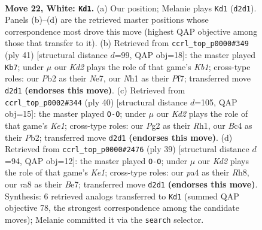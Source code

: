 \documentclass[11pt]{article}
\begin{document}
\clearpage

\begin{figure}[p]\centering
\begin{subfigure}{0.46\textwidth}\centering
\resizebox{\linewidth}{!}{%
\newchessgame
\chessboard[
  setfen={r3kb2/2n1n1pr/6b1/7p/p1B1pP1P/P3R3/1P1K2P1/R5NN w q - 4 22},
  showmover=false,
  pgfstyle=straightmove, color=movearrow, markmove={d2-d1}
]}
\caption{}
\end{subfigure}\hfill
\begin{subfigure}{0.46\textwidth}\centering
\resizebox{\linewidth}{!}{%
\newchessgame
\chessboard[
  setfen={1k1r3r/2p1npp1/1p6/p6p/Pn1PPB2/5P2/3RN1PP/5RK1 b - - 2 21},
  showmover=false,
  pgfstyle=straightmove, color=movearrow, markmove={b8-b7}
]}
\caption{}
\end{subfigure}
\\[4pt]
\begin{subfigure}{0.46\textwidth}\centering
\resizebox{\linewidth}{!}{%
\newchessgame
\chessboard[
  setfen={rn4k1/p2p2bp/5pp1/N2bn3/1p6/4B2P/1P2NPP1/R3K2R w KQ - 0 21},
  showmover=false,
  pgfstyle=straightmove, color=movearrow, markmove={e1-g1}
]}
\caption{}
\end{subfigure}\hfill
\begin{subfigure}{0.46\textwidth}\centering
\resizebox{\linewidth}{!}{%
\newchessgame
\chessboard[
  setfen={r3k2r/p3bpp1/2p1p2p/7P/2NPn3/4B3/PP3PP1/2KR3R b kq - 0 20},
  showmover=false,
  pgfstyle=straightmove, color=movearrow, markmove={e8-g8}
]}
\caption{}
\end{subfigure}
\caption{\textbf{Move 22, White: \texttt{Kd1}.} (a) Our position; Melanie plays \texttt{Kd1} (\texttt{d2d1}). Panels (b)--(d) are the retrieved master positions whose correspondence most drove this move (highest QAP objective among those that transfer to it). (b) Retrieved from \texttt{ccrl\_top\_p0000\#349} (ply 41) [structural distance $d$=99, QAP obj=18]: the master played \texttt{Kb7}; under $\mu$ our \emph{Kd2} plays the role of that game's \emph{Kb1}; cross-type roles: our \emph{P}b2 as their \emph{N}e7, our \emph{N}h1 as their \emph{P}f7; transferred move \texttt{d2d1} \textbf{(endorses this move)}. (c) Retrieved from \texttt{ccrl\_top\_p0002\#344} (ply 40) [structural distance $d$=105, QAP obj=15]: the master played \texttt{O-O}; under $\mu$ our \emph{Kd2} plays the role of that game's \emph{Ke1}; cross-type roles: our \emph{P}g2 as their \emph{R}h1, our \emph{B}c4 as their \emph{P}b2; transferred move \texttt{d2d1} \textbf{(endorses this move)}. (d) Retrieved from \texttt{ccrl\_top\_p0000\#2476} (ply 39) [structural distance $d$=94, QAP obj=12]: the master played \texttt{O-O}; under $\mu$ our \emph{Kd2} plays the role of that game's \emph{Ke1}; cross-type roles: our \emph{p}a4 as their \emph{R}h8, our \emph{r}a8 as their \emph{B}e7; transferred move \texttt{d2d1} \textbf{(endorses this move)}. Synthesis: 6 retrieved analogs transferred to \texttt{Kd1} (summed QAP objective 78, the strongest correspondence among the candidate moves); Melanie committed it via the \texttt{search} selector.}
\label{fig:thought-m42}
\end{figure}
\end{document}
